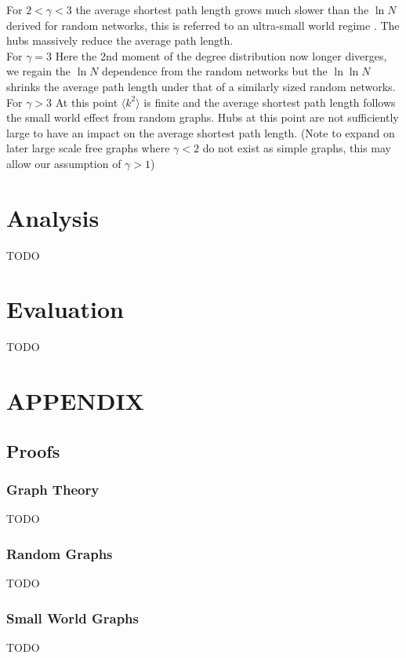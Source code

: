 \documentclass{article}
\begin{document}
        For $2<\gamma<3$ the average shortest path length grows much slower than the $\ln N$ derived for random networks, this is referred to an ultra-small world regime \parencite{cohen2003scale}. The hubs massively reduce the average path length.\\
        For $\gamma =3$ Here the 2nd moment of the degree distribution now longer diverges, we regain the $\ln N$ dependence from the random networks but the $\ln\ln N$ shrinks the average path length under that of a similarly sized random networks.\\
        For $\gamma > 3$ At this point $\langle k^2 \rangle$ is finite and the average shortest path length follows the small world effect from random graphs. Hubs at this point are not sufficiently large to have an impact on the average shortest path length.
        (Note to expand on later large scale free graphs where $\gamma < 2$ do not exist as simple graphs, this may allow our assumption of $\gamma >1$)




    \section{Analysis}
    TODO
    \section{Evaluation}
    TODO
    \section{APPENDIX}
        \subsection{Proofs}
            \subsubsection{Graph Theory}
            TODO
            \subsubsection{Random Graphs}
            TODO
            \subsubsection{Small World Graphs}
            TODO
\end{document}

